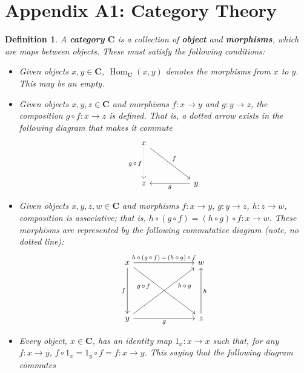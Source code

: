 \documentclass[12pt,reqno]{amsart}
\theoremstyle{plain}
\newtheorem{defi}{Definition}
\newcommand{\cat}{\mathbf{C}}
\DeclareMathOperator{\Hom}{Hom}
\begin{document}
\section*{Appendix A1: Category Theory}
\begin{defi} A \textbf{category} $\mathbf{C}$ is a collection of \textbf{object} and \textbf{morphisms}, which are maps between objects. These must satisfy the following conditions: 
\begin{itemize}
\item[\textup{(i)}] Given objects $x, y \in \cat$, $\Hom_{\cat} (x, y)$ denotes the morphisms from $x$ to $y$. This may be an empty. 
\item[\textup{(ii)}] Given objects $x, y, z \in \cat$ and morphisms $f \colon x \to y$ and $g \colon y \to z$, the composition $g \circ f \colon x \to z$ is defined. That is, a dotted arrow exists in the following diagram that makes it commute 
\[ 
\begin{tikzcd}
x \arrow[rrdd, "f"] \arrow[dd, "g \, \circ \, f"', dotted] &  &                   \\
                                             &  &                   \\
z                                            &  & y \arrow[ll, "g"]
\end{tikzcd}
\] 
\item[\textup{(iii)}] Given objects $x, y, z, w \in \cat$ and morphisms $f \colon x \to y$, $g \colon y \to z$, $h \colon z \to w$, composition is associative; that is, $h \circ ( g \circ f) = (h \circ g) \circ f \colon x \to w$. These morphisms are represented by the following commutative diagram (note, no dotted line): 
\[
\begin{tikzcd}
x \arrow[ddd, "f"'] \arrow[rrr, "h \, \circ \, ( g \, \circ \, f) \, = \, (h \, \circ \, g) \, \circ \, f"] \arrow[rrrddd, "\; \; \; \; \; \; h \, \circ \, y"] &  &  & w                   \\
                                                         &  &  &                     \\
                                                         &  &  &                     \\
y \arrow[rrr, "g"'] \arrow[rrruuu, "g \, \circ \, f \; \; \; \; \; \; "]                  &  &  & z \arrow[uuu, "h"']
\end{tikzcd}
\]
\item[\textup{(iiii)}] Every object, $x \in \cat$, has an identity map $1_x \colon x \to x$ such that, for any $f \colon x \to y$, $f \circ 1_x = 1_y \circ f = f \colon x \to y$. This saying that the following diagram commutes

\end{itemize}
\end{defi}
\end{document}
